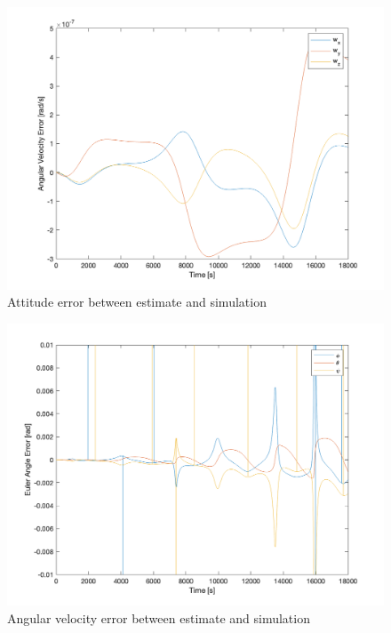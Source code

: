 \begin{figure}[H]
\centering
\includegraphics[scale=0.6]{Images/ps7_problem6_angvel_err.png}
\caption{Attitude error between estimate and simulation}
\label{fig:ps7_problem5a_angvel_sim}
\end{figure}

\begin{figure}[H]
\centering
\includegraphics[scale=0.6]{Images/ps7_problem6_angle_err.png}
\caption{Angular velocity error between estimate and simulation}
\label{fig:ps7_problem5a_angvel_sim}
\end{figure}